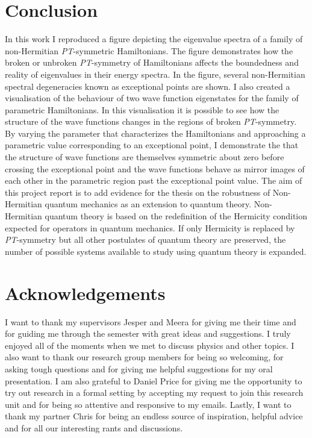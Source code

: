 \documentclass[10pt, a4paper, singlespacing]{report}
\newcommand\PT{\emph{PT}}
\begin{document}
\chapter{Conclusion}\label{Conclusion}
 In this work I reproduced a figure depicting the eigenvalue spectra of a family of non-Hermitian \PT-symmetric Hamiltonians. The figure demonstrates how the broken or unbroken \PT-symmetry of Hamiltonians affects the boundedness and reality of eigenvalues in their energy spectra. In the figure, several non-Hermitian spectral degeneracies known as exceptional points are shown. I also created a visualisation of the behaviour of two wave function eigenstates for the family of parametric Hamiltonians. In this visualisation it is possible to see how the structure of the wave functions changes in the regions of broken \PT-symmetry. By varying the parameter that characterizes the Hamiltonians and approaching a parametric value corresponding to an exceptional point, I demonstrate the that the structure of wave functions are themselves symmetric about zero before crossing the exceptional point and the wave functions behave as mirror images of each other in the parametric region past the exceptional point value. The aim of this project report is to add evidence for the thesis on the robustness of Non-Hermitian quantum mechanics as an extension to quantum theory. Non-Hermitian quantum theory is based on the redefinition of the Hermicity condition expected for operators in quantum mechanics. If only Hermicity is replaced by \PT-symmetry but all other postulates of quantum theory are preserved, the number of possible systems available to study using quantum theory is expanded.

\chapter{Acknowledgements}\label{Acknowledgements}
I want to thank my supervisors Jesper and Meera for giving me their time and for guiding me through the semester with great ideas and suggestions. I truly enjoyed all of the moments when we met to discuss physics and other topics. I also want to thank our research group members for being so welcoming, for asking tough questions and for giving me helpful suggestions for my oral presentation. I am also grateful to Daniel Price for giving me the opportunity to try out research in a formal setting by accepting my request to join this research unit and for being so attentive and responsive to my emails. Lastly, I want to thank my partner Chris for being an endless source of inspiration, helpful advice and for all our interesting rants and discussions. 
\end{document}
